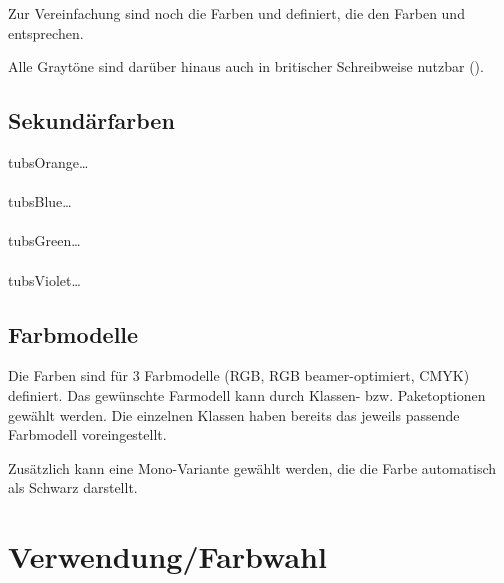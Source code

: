 
Zur Vereinfachung sind noch die Farben  und
 definiert, die den Farben  und
 entsprechen.

Alle Graytöne sind darüber hinaus auch in britischer Schreibweise nutzbar
().


\pagebreak
\subsection{Sekundärfarben}
  tubsOrange\ldots\\
  \\[-1ex]
  tubsBlue\ldots\\
  \\[-1ex]
  tubsGreen\ldots\\
  \\[-1ex]
  tubsViolet\ldots\\


% 

\subsection{Farbmodelle}

Die Farben sind für 3 Farbmodelle (RGB, RGB beamer-optimiert, CMYK) definiert.
Das gewünschte Farmodell kann durch Klassen- bzw. Paketoptionen gewählt werden.
Die einzelnen Klassen haben bereits das jeweils passende Farbmodell voreingestellt.

Zusätzlich kann eine Mono-Variante gewählt werden, die die Farbe
 automatisch als Schwarz darstellt.


\clearpage
\section{Verwendung/Farbwahl}
\sloppy

